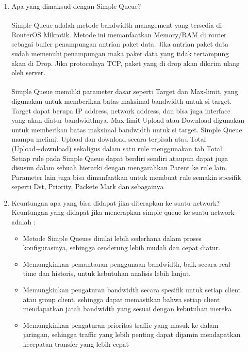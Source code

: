 \begin{enumerate}
	\item Apa yang dimaksud dengan Simple Queue? \\
	\\ \indent Simple Queue adalah metode bandwidth management yang tersedia di RouterOS Mikrotik. 
	Metode ini memanfaatkan Memory/RAM di router sebagai buffer penampungan antrian paket data. 
	Jika antrian paket data sudah memenuhi penampungan maka paket data yang tidak tertampung akan di Drop. 
	Jika protocolnya TCP, paket yang di drop akan dikirim ulang oleh server. 
	\\ \\ \indent Simple Queue memiliki parameter dasar seperti Target dan Max-limit, yang digunakan untuk memberikan batas maksimal bandwidth untuk si target. 
	Target dapat berupa IP address, network address, dan bisa juga interface yang akan diatur bandwidthnya. Max-limit Upload atau Download digunakan untuk memberikan batas maksimal bandwidth untuk si target. 
	Simple Queue mampu melimit Upload dan download secara terpisah atau Total (Upload+download) sekaligus dalam satu rule menggunakan tab Total. 
	Setiap rule pada Simple Queue dapat berdiri sendiri ataupun dapat juga disusun dalam sebuah hierarki dengan mengarahkan Parent ke rule lain. 
	Parameter lain juga bisa dimanfaatkan untuk membuat rule semakin spesifik seperti Dst, Priority, Packete Mark dan sebagainya

	\item Keuntungan apa yang bisa didapat jika diterapkan ke suatu network?
	\\ Keuntungan yang didapat jika menerapkan simple queue ke suatu network adalah : 
	\begin{itemize}
		\item[\ding{58}] Metode Simple Queues dinilai lebih sederhana dalam proses konfigurasinya, sehingga cenderung lebih mudah dan cepat diatur.
		\item[\ding{58}] Memungkinkan pemantauan penggunaan bandwidth, baik secara real-time dan historis, untuk kebutuhan analisis lebih lanjut.
		\item[\ding{58}] Memungkinkan pengaturan bandwidth secara spesifik untuk setiap client atau group client, sehingga dapat memastikan bahwa setiap client mendapatkan jatah bandwidth yang sesuai dengan kebutuhan mereka
		\item[\ding{58}] Memungkinkan pengaturan prioritas traffic yang masuk ke dalam jaringan, sehingga traffic yang lebih penting dapat dijamin mendapatkan kecepatan transfer yang lebih cepat 
	\end{itemize}

\end{enumerate}

